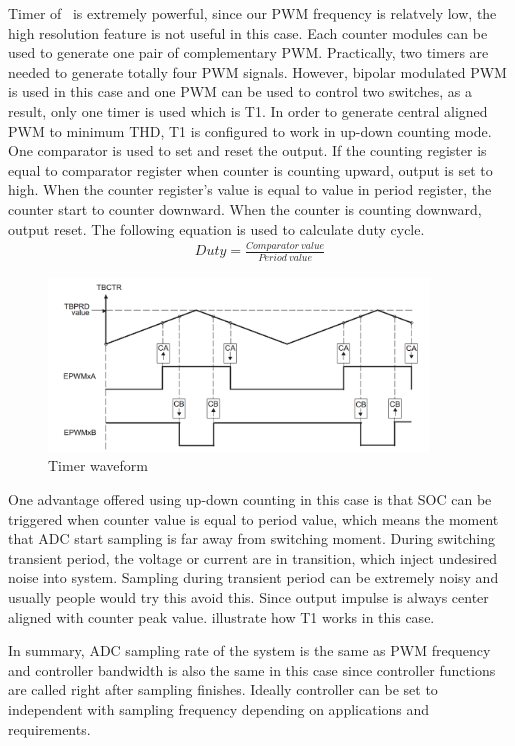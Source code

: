 Timer of \tms~is extremely powerful, since our \gls{PWM} frequency is relatvely low, the high resolution feature is not useful in this case. Each counter modules can be used to generate one pair of complementary \gls{PWM}. Practically, two timers are needed to generate totally four \gls{PWM} signals. However, bipolar modulated \gls{PWM} is used in this case and one \gls{PWM} can be used to control two switches, as a result, only one timer is used which is T1. In order to generate central aligned \gls{PWM} to minimum THD, T1 is configured to work in up-down counting mode. One comparator is used to set and reset the output. If the counting register is equal to comparator register when counter is counting upward, output is set to high. When the counter register's value is equal to value in period register, the counter start to counter downward. When the counter is counting downward, output reset. The following equation is used to calculate duty cycle. 
\begin{align}
    Duty = \frac{Comparator\ value}{Period\ value}
\end{align} 
\begin{figure}[h]
     \centering
     \includegraphics[width = 0.9\textwidth]{figures/timer_wave}
     \caption{Timer waveform}
     \label{fig:timer_wave}
\end{figure}
One advantage offered using up-down counting in this case is that SOC can be triggered when counter value is equal to period value, which means the moment that ADC start sampling is far away from switching moment. During switching transient period, the voltage or current are in transition, which inject undesired noise into system. Sampling during transient period can be extremely noisy and usually people would try this avoid this. Since output impulse is always center aligned with counter peak value.  illustrate how T1 works in this case. 

In summary, ADC sampling rate of the system is the same as \gls{PWM} frequency and controller bandwidth is also the same in this case since controller functions are called right after sampling finishes. Ideally controller can be set to independent with sampling frequency depending on applications and requirements.
